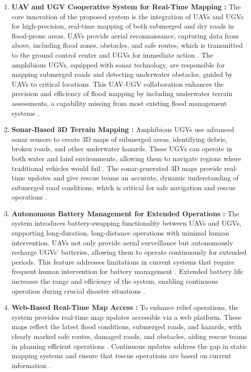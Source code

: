 \documentclass[conference]{IEEEtran}
\begin{document}
\begin{enumerate}
	\item \textbf{UAV and UGV Cooperative System for Real-Time Mapping : }
	The core innovation of the proposed system is the integration of UAVs and UGVs for high-precision, real-time mapping of both submerged and dry roads in flood-prone areas. UAVs provide aerial reconnaissance, capturing data from above, including flood zones, obstacles, and safe routes, which is transmitted to the ground control center and UGVs for immediate action \cite{ref4}. The amphibious UGVs, equipped with sonar technology, are responsible for mapping submerged roads and detecting underwater obstacles, guided by UAVs to critical locations. This UAV-UGV collaboration enhances the precision and efficiency of flood mapping by including underwater terrain assessments, a capability missing from most existing flood management systems \cite{ref5}.
	
	\item \textbf{Sonar-Based 3D Terrain Mapping : }
Amphibious UGVs use advanced sonar sensors to create 3D maps of submerged areas, identifying debris, broken roads, and other underwater hazards. These UGVs can operate in both water and land environments, allowing them to navigate regions where traditional vehicles would fail \cite{ref6}. The sonar-generated 3D maps provide real-time updates and give rescue teams an accurate, dynamic understanding of submerged road conditions, which is critical for safe navigation and rescue operations \cite{ref7}.
	
	\item \textbf{Autonomous Battery Management for Extended Operations : }The system introduces battery-swapping functionality between UAVs and UGVs, supporting long-duration, long-distance operations with minimal human intervention. UAVs not only provide aerial surveillance but autonomously recharge UGVs' batteries, allowing them to operate continuously for extended periods. This feature addresses limitations in current systems that require frequent human intervention for battery management \cite{ref8}. Extended battery life increases the range and efficiency of the system, enabling continuous operation during crucial disaster situations \cite{ref9}.
	
	
	\item \textbf{Web-Based Real-Time Map Access : }
To enhance relief operations, the system provides real-time map updates accessible via a web platform. These maps reflect the latest flood conditions, submerged roads, and hazards, with clearly marked safe routes, damaged roads, and obstacles, aiding rescue teams in planning efficient operations \cite{ref10}. Continuous updates address the gap in static mapping systems and ensure that rescue operations are based on current information \cite{ref11}.
	

\end{enumerate}
\end{document}
